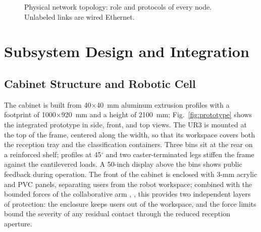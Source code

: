 ﻿\documentclass[conference]{IEEEtran}
\begin{document}
\begin{figure}[!t]
\caption{Physical network topology: role and protocols of every node. Unlabeled links are wired Ethernet.}
\label{fig:topology}
\end{figure}

\section{Subsystem Design and Integration}
\subsection{Cabinet Structure and Robotic Cell}
The cabinet is built from 40$\times$40~mm aluminum extrusion profiles with a footprint of 1000$\times$920~mm and a height of 2100~mm; Fig.~\ref{fig:prototype} shows the integrated prototype in side, front, and top views. The UR3 is mounted at the top of the frame, centered along the width, so that its workspace covers both the reception tray and the classification containers. Three bins sit at the rear on a reinforced shelf; profiles at 45$^{\circ}$ and two caster-terminated legs stiffen the frame against the cantilevered loads. A 50-inch display above the bins shows public feedback during operation. The front of the cabinet is enclosed with 3-mm acrylic and PVC panels, separating users from the robot workspace; combined with the bounded forces of the collaborative arm \cite{b10}, \cite{b11}, this provides two independent layers of protection: the enclosure keeps users out of the workspace, and the force limits bound the severity of any residual contact through the reduced reception aperture.
\end{document}
